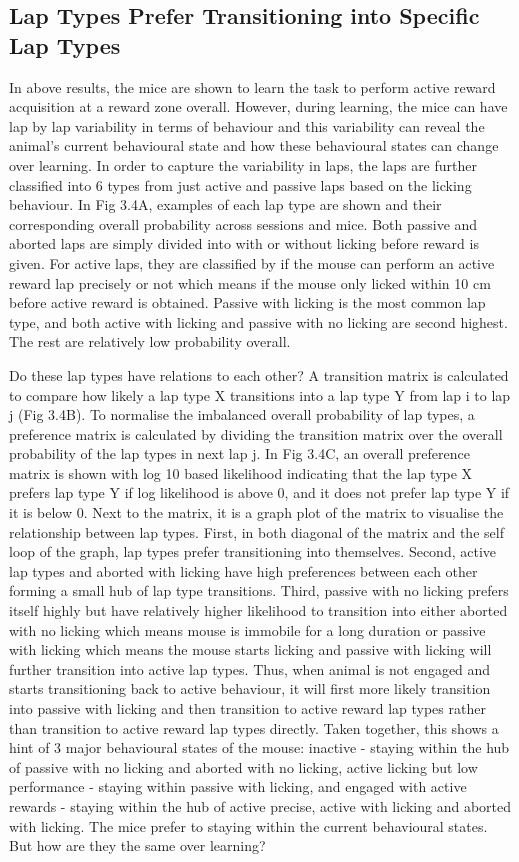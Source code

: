 \subsection{Lap Types Prefer Transitioning into Specific Lap Types}
In above results, the mice are shown to learn the task to perform active reward acquisition at a reward zone overall. However, during learning, the mice can have lap by lap variability in terms of behaviour and this variability can reveal the animal's current behavioural state and how these behavioural states can change over learning. In order to capture the variability in laps, the laps are further classified into 6 types from just active and passive laps based on the licking behaviour. In Fig 3.4A, examples of each lap type are shown and their corresponding overall probability across sessions and mice. Both passive and aborted laps are simply divided into with or without licking before reward is given. For active laps, they are classified by if the mouse can perform an active reward lap precisely or not which means if the mouse only licked within 10 cm before active reward is obtained. Passive with licking is the most common lap type, and both active with licking and passive with no licking are second highest. The rest are relatively low probability overall. 

Do these lap types have relations to each other? A transition matrix is calculated to compare how likely a lap type X transitions into a lap type Y from lap i to lap j (Fig 3.4B). To normalise the imbalanced overall probability of lap types, a preference matrix is calculated by dividing the transition matrix over the overall probability of the lap types in next lap j. In Fig 3.4C, an overall preference matrix is shown with log 10 based likelihood indicating that the lap type X prefers lap type Y if log likelihood is above 0, and it does not prefer lap type Y if it is below 0. Next to the matrix, it is a graph plot of the matrix to visualise the relationship between lap types. First, in both diagonal of the matrix and the self loop of the graph, lap types prefer transitioning into themselves. Second, active lap types and aborted with licking have high preferences between each other forming a small hub of lap type transitions. Third, passive with no licking prefers itself highly but have relatively higher likelihood to transition into either aborted with no licking which means mouse is immobile for a long duration or passive with licking which means the mouse starts licking and passive with licking will further transition into active lap types. Thus, when animal is not engaged and starts transitioning back to active behaviour, it will first more likely transition into passive with licking and then transition to active reward lap types rather than transition to active reward lap types directly. Taken together, this shows a hint of 3 major behavioural states of the mouse: inactive - staying within the hub of passive with no licking and aborted with no licking, active licking but low performance - staying within passive with licking, and engaged with active rewards - staying within the hub of  active precise, active with licking and aborted with licking. The mice prefer to staying within the current behavioural states. But how are they the same over learning?

